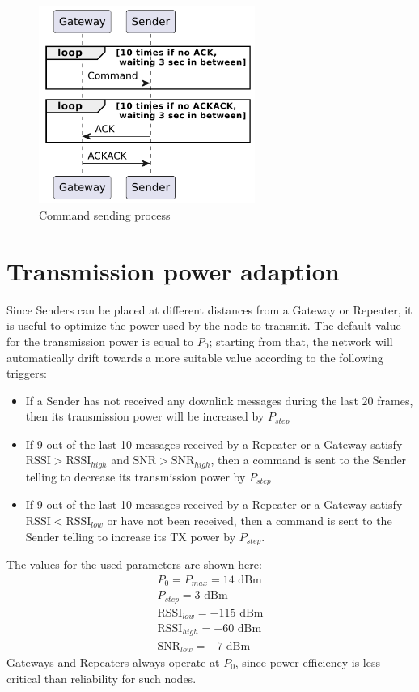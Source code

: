 \begin{figure}[h]
    \centering
    \includegraphics[width=200pt]{uml/command_ack.pdf}
    \caption{Command sending process}
    \label{img: command ack}
\end{figure}

\section{Transmission power adaption}
\label{sec: transmission power adaption}
Since Senders can be placed at different distances from a Gateway or Repeater, it is useful to optimize the power
used by the node to transmit. The default value for the transmission power is equal to $P_{0}$; starting from that, the
network will automatically drift towards a more suitable value according to the
following triggers:
\begin{itemize}
    \item If a Sender has not received any downlink messages during
        the last 20 frames, then its transmission power will be increased by $P_{step}$
    \item If 9 out of the last 10 messages received by a Repeater or a Gateway
        satisfy $\text{RSSI} > \text{RSSI}_{high}$ and $\text{SNR} > \text{SNR}_{high}$, then
        a command is sent to the Sender telling to decrease its transmission power by $P_{step}$
    \item If 9 out of the last 10 messages received by a Repeater or a Gateway
        satisfy $\text{RSSI} < \text{RSSI}_{low}$ or have not been received, then a command is sent to the Sender telling to
        increase its TX power by $P_{step}$.
\end{itemize}
The values for the used parameters are shown here:
\begin{equation}
    \begin{array}{l}
        P_{0} = P_{max} = 14\text{ dBm} \\ P_{step} = 3\text{ dBm} \\ \text{RSSI}_{low} = -115\text{ dBm} \\ \text{RSSI}
        _{high} = -60\text{ dBm} \\ \text{SNR}_{low} = -7\text{ dBm}
    \end{array}
\end{equation}
Gateways and Repeaters always operate at $P_{0}$, since power efficiency is less critical than reliability for such nodes.


